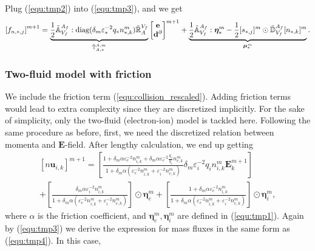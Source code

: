 \documentclass{report}
\begin{document}
Plug (\ref{equ:tmp2}) into (\ref{equ:tmp3}), and we get
\begin{equation} \label{equ:tmp4}
    \left[f_{n,*,j}\right]^{m+1} = \underbrace{\frac{1}{2} \Tilde{\mathbb{A}}_{V_f}^{A_f} : \text{diag}(\delta_m \varepsilon^{-2}_* q_* n^m_{*,k}) \Tilde{\mathbb{R}}^{V_f}_{A}}_{\Tilde{\mathbb{T}}_{A,*}^{A,m}}   
    \begin{bmatrix}
    \mathbf{e} \\
    \mathbf{d}^\partial 
    \end{bmatrix}^{m+1} + \underbrace{\frac{1}{2}\Tilde{\mathbb{A}}_{V_f}^{A_f} :\bm{\eta}^m_* - \frac{1}{2} [s_{*,j}]^m \odot \Tilde{\mathbb{D}}_{V_f}^{A_f} [n_{*,k}]^m}_{\bm{\mu}^m_*}.
\end{equation} 

\subsubsection{Two-fluid model with friction}
We include the friction term (\ref{equ:collision_rescaled}). Adding friction terms would lead to extra complexity since they are discretized implicitly. For the sake of simplicity, only the two-fluid (electron-ion) model is tackled here. Following the same procedure as before, first, we need the discretized relation between momenta and $\mathbf{E}$-field. After lengthy calculation, we end up getting
\begin{multline}\label{equ:tmp13}
    [n\mathbf{u}_{i,k}]^{m+1} = \left[\frac{1 + \delta_m \alpha \varepsilon_e^{-2} n_{i,k}^m + \delta_m \alpha \varepsilon_e^{-2} \frac{q_e}{q_i}n_{e,k}^m }{1 + \delta_m \alpha (\varepsilon^{-2}_e n_{i,k}^m + \varepsilon_i^{-2} n_{e,k}^m)} \delta_m \varepsilon^{-2}_i q_i n_{i,k}^m \mathbf{E}^{m+1}_k\right] \\
    + \left[\frac{\delta_m \alpha \varepsilon_i^{-2} n_{i,k}^m}{1 + \delta_m \alpha (\varepsilon^{-2}_e n_{i,k}^m + \varepsilon^{-2}_i n_{e,k}^m)}\right] \odot \bm{\eta}_e^m + \left[\frac{1 + \delta_m \alpha \varepsilon^{-2}_e n_{i,k}^m}{1 + \delta_m \alpha (\varepsilon^{-2}_e n_{i,k}^m + \varepsilon^{-2}_i n_{e,k}^m)}\right] \odot \bm{\eta}_i^m,
\end{multline}
where $\alpha$ is the friction coefficient, and $\bm{\eta}_e^m, \bm{\eta}_i^m$ are defined in (\ref{equ:tmp1}). Again by (\ref{equ:tmp3}) we derive the expression for mass fluxes in the same form as (\ref{equ:tmp4}). In this case, 
\end{document}
